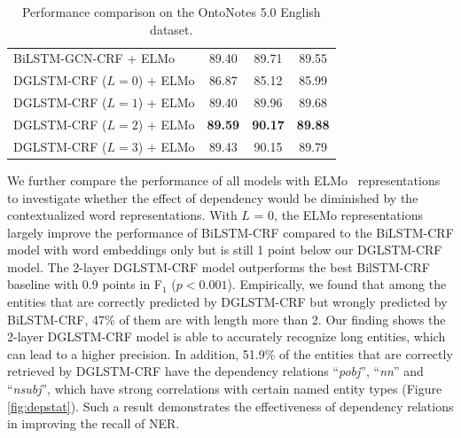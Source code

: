 \begin{table}[h!]
\begin{tabular}{lccc}
			BiLSTM-GCN-CRF +  {\footnotesize ELMo}   & 89.40 & 89.71 & 89.55 \\
			\cdashlinelr{1-4}
			DGLSTM-CRF ($L=0$) + {\footnotesize ELMo} &86.87  &85.12  &85.99 \\
			DGLSTM-CRF ($L=1$) + {\footnotesize ELMo} & 89.40 & 89.96 & 89.68 \\
			DGLSTM-CRF ($L=2$) + {\footnotesize ELMo} & \textbf{89.59} & \textbf{90.17} & {\bf 89.88} \\
			DGLSTM-CRF ($L=3$) + {\footnotesize ELMo} & 89.43 & 90.15 & 89.79 \\
			\bottomrule
		\end{tabular}
	\caption{Performance comparison on the OntoNotes 5.0 English dataset.}
	\label{tab:mainresults}
\end{table}

We further compare the performance of all models with ELMo~\cite{peters2018deep} representations to investigate whether the effect of dependency would be diminished by the contextualized word representations. 
With $L$ = $0$, the ELMo representations largely improve the performance of BiLSTM-CRF compared to the BiLSTM-CRF model with word embeddings only but is still 1 point below our DGLSTM-CRF model. 
The 2-layer DGLSTM-CRF model outperforms the best BilSTM-CRF baseline with 0.9 points in F$_1$ ($p<0.001$).
Empirically, we found that among the entities that are correctly predicted by DGLSTM-CRF but wrongly predicted by BiLSTM-CRF, 47\% of them are with length more than 2. 
Our finding shows the 2-layer DGLSTM-CRF model is able to accurately recognize long entities, which can lead to a higher precision.  
In addition, 51.9\% of the entities that are correctly retrieved by DGLSTM-CRF have the dependency relations ``\textit{pobj}'', ``\textit{nn}'' and ``\textit{nsubj}'', which have strong correlations with certain named entity types (Figure \ref{fig:depstat}).  
Such a result demonstrates the effectiveness of dependency relations in improving the recall of NER.





